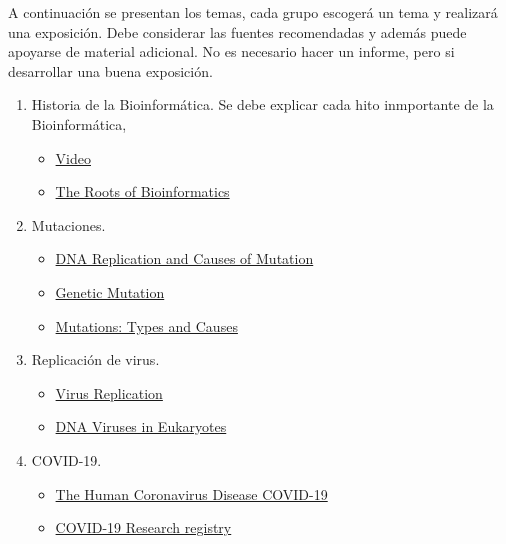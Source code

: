 \documentclass{article}
\begin{document}
	A continuación se presentan los temas, cada grupo escogerá un tema y realizará una exposición. Debe considerar las fuentes recomendadas y además puede apoyarse de material adicional. No es necesario hacer un informe, pero si desarrollar una buena exposición.
	
	\begin{enumerate}
		\item Historia de la Bioinformática. Se debe explicar cada hito inmportante de la Bioinformática, 
			\begin{itemize}
				\item \href{https://www.coursera.org/learn/bioinformatics-pku/lecture/0i4EF/history-of-bioinformatics}{Video}
				\item \href{https://journals.plos.org/ploscompbiol/article?id=10.1371/journal.pcbi.1000809}{The Roots of Bioinformatics}
			\end{itemize}
		\item Mutaciones. 
			\begin{itemize}
				\item \href{https://www.nature.com/scitable/topicpage/dna-replication-and-causes-of-mutation-409/}{DNA Replication and Causes of Mutation}
				\item \href{https://www.nature.com/scitable/topicpage/genetic-mutation-441/}{Genetic Mutation}
				\item \href{https://www.ncbi.nlm.nih.gov/books/NBK21578/}{Mutations: Types and Causes}
			\end{itemize}
		
		\item Replicación de virus. 
		\begin{itemize}
			\item \href{https://reader.elsevier.com/reader/sd/pii/B9780123751560000047?token=9B13E6DC096F4D4A969692D3BE8C9F7F7A9EB515D7CEC08023BB74B04F1BDD0C115766A9665D276C5990CAA8124564E6}{Virus Replication}
			\item \href{https://courses.lumenlearning.com/boundless-microbiology/chapter/dna-viruses-in-eukaryotes/}{DNA Viruses in Eukaryotes}
			
		\end{itemize}
	
		\item COVID-19.
		\begin{itemize}
			\item \href{https://drive.google.com/file/d/19nQoOZv8gpxrDPQtlZHTMKygRZD2f15s/view?usp=sharing}{The Human Coronavirus Disease COVID-19}
			\item \href{https://www.asm.org/COVID/COVID-19-Research-Registry/Basic-Virology}{COVID-19 Research registry}			
		\end{itemize}
	

\end{enumerate}
\end{document}
